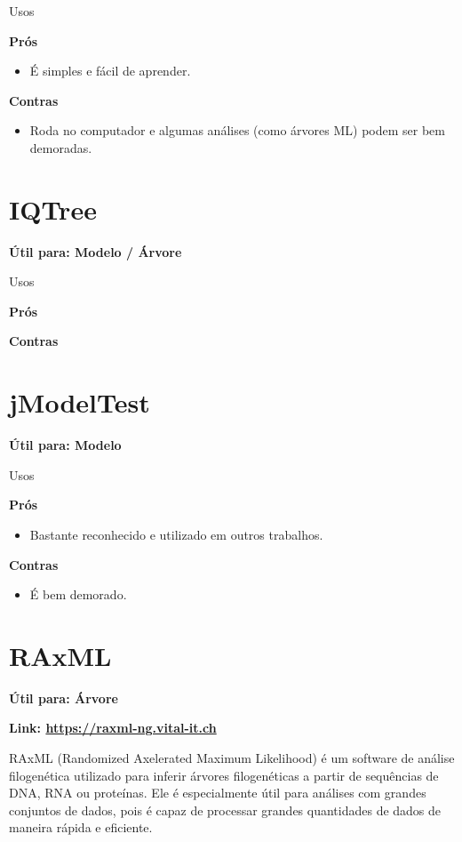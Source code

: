 \documentclass[
  letterpaper,
  DIV=11,
  numbers=noendperiod]{scrreprt}
\providecommand{\tightlist}{%
  \setlength{\itemsep}{0pt}\setlength{\parskip}{0pt}}\usepackage{longtable,booktabs,array}
\begin{document}
Usos

\textbf{Prós}

\begin{itemize}
\tightlist
\item
  É simples e fácil de aprender.
\end{itemize}

\textbf{Contras}

\begin{itemize}
\tightlist
\item
  Roda no computador e algumas análises (como árvores ML) podem ser bem
  demoradas.
\end{itemize}

\hypertarget{iqtree}{%
\section{IQTree}\label{iqtree}}

\textbf{Útil para: {Modelo} / {Árvore}}

Usos

\textbf{Prós}

\textbf{Contras}

\hypertarget{jmodeltest}{%
\section{jModelTest}\label{jmodeltest}}

\textbf{Útil para: {Modelo}}

Usos

\textbf{Prós}

\begin{itemize}
\tightlist
\item
  Bastante reconhecido e utilizado em outros trabalhos.
\end{itemize}

\textbf{Contras}

\begin{itemize}
\tightlist
\item
  É bem demorado.
\end{itemize}

\hypertarget{raxml}{%
\section{RAxML}\label{raxml}}

\textbf{Útil para: {Árvore}}

\textbf{Link: \url{https://raxml-ng.vital-it.ch}}

RAxML (Randomized Axelerated Maximum Likelihood) é um software de
análise filogenética utilizado para inferir árvores filogenéticas a
partir de sequências de DNA, RNA ou proteínas. Ele é especialmente útil
para análises com grandes conjuntos de dados, pois é capaz de processar
grandes quantidades de dados de maneira rápida e eficiente.
\end{document}
